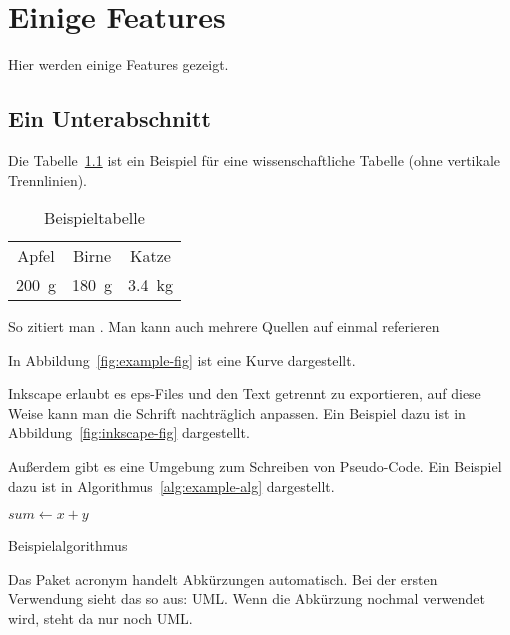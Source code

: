 %
%
\chapter{Einige Features}
Hier werden einige Features gezeigt.

\section{Ein Unterabschnitt}
Die Tabelle~\ref{tab:example-table} ist ein Beispiel für eine wissenschaftliche Tabelle (ohne vertikale Trennlinien).

\begin{table}[ht]
\caption{Beispieltabelle}
\centering
\begin{tabular}{@{}ccc@{}} \toprule
    Apfel & Birne & Katze \\
    \SI{200}{g} & \SI{180}{g} & \SI{3.4}{kg} \\ \bottomrule
\end{tabular}
\label{tab:example-table}
\end{table}

So zitiert man \cite{slam06}. Man kann auch mehrere Quellen auf einmal referieren \cite{pomax16, dlib09, biagiotti_open-loop_2012, hunter_matplotlib:_2007}

In Abbildung~\ref{fig:example-fig} ist eine Kurve dargestellt.

Inkscape erlaubt es eps-Files und den Text getrennt zu exportieren, auf diese Weise kann man die Schrift nachträglich anpassen. Ein Beispiel dazu ist in Abbildung~\ref{fig:inkscape-fig} dargestellt.

Außerdem gibt es eine Umgebung zum Schreiben von Pseudo-Code. Ein Beispiel dazu ist in Algorithmus~\ref{alg:example-alg} dargestellt.
\begin{algorithm}
\begin{algorithmic}[1]
	\State $sum \gets x + y$
		\State {}
   	\EndIf
\EndProcedure
\end{algorithmic}
\caption{Beispielalgorithmus}
\label{alg:example-alg}
\end{algorithm}

Das Paket acronym handelt Abkürzungen automatisch. Bei der ersten Verwendung sieht das so aus: \ac{UML}. Wenn die Abkürzung nochmal verwendet wird, steht da nur noch \ac{UML}.


